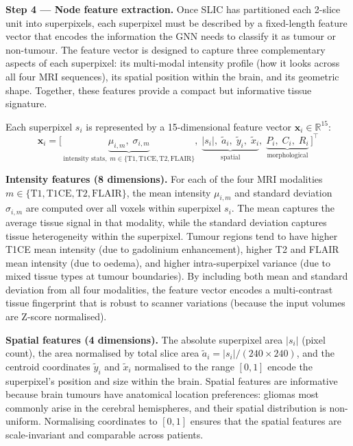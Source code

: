 \documentclass{article}
\begin{document}
\textbf{Step 4 --- Node feature extraction.}
Once SLIC has partitioned each 2-slice unit into superpixels, each superpixel must
be described by a fixed-length feature vector that encodes the information the GNN
needs to classify it as tumour or non-tumour. The feature vector is designed to
capture three complementary aspects of each superpixel: its multi-modal intensity
profile (how it looks across all four MRI sequences), its spatial position within
the brain, and its geometric shape. Together, these features provide a compact but
informative tissue signature.

Each superpixel $s_i$ is represented by a 15-dimensional feature vector
$\mathbf{x}_i \in \mathbb{R}^{15}$:
\[
    \mathbf{x}_i =
    \bigl[\,
        \underbrace{\mu_{i,m},\; \sigma_{i,m}}_{\text{intensity stats},\; m \in \{
        \text{T1},\text{T1CE},\text{T2},\text{FLAIR}\}},\;
        \underbrace{|s_i|,\; \tilde{a}_i,\; \tilde{y}_i,\; \tilde{x}_i}_{\text{spatial}},\;
        \underbrace{P_i,\; C_i,\; R_i}_{\text{morphological}}
    \,\bigr]^\top
\]

\textbf{Intensity features (8 dimensions).} For each of the four MRI modalities
$m \in \{\text{T1}, \text{T1CE}, \text{T2}, \text{FLAIR}\}$, the mean intensity
$\mu_{i,m}$ and standard deviation $\sigma_{i,m}$ are computed over all voxels
within superpixel $s_i$. The mean captures the average tissue signal in that
modality, while the standard deviation captures tissue heterogeneity within the
superpixel. Tumour regions tend to have higher T1CE mean intensity (due to
gadolinium enhancement), higher T2 and FLAIR mean intensity (due to oedema), and
higher intra-superpixel variance (due to mixed tissue types at tumour boundaries).
By including both mean and standard deviation from all four modalities, the feature
vector encodes a multi-contrast tissue fingerprint that is robust to scanner
variations (because the input volumes are Z-score normalised).

\textbf{Spatial features (4 dimensions).} The absolute superpixel area $|s_i|$
(pixel count), the area normalised by total slice area $\tilde{a}_i = |s_i| /
(240 \times 240)$, and the centroid coordinates $\tilde{y}_i$ and $\tilde{x}_i$
normalised to the range $[0,1]$ encode the superpixel's position and size within
the brain. Spatial features are informative because brain tumours have anatomical
location preferences: gliomas most commonly arise in the cerebral hemispheres, and
their spatial distribution is non-uniform. Normalising coordinates to $[0,1]$
ensures that the spatial features are scale-invariant and comparable across patients.
\end{document}
